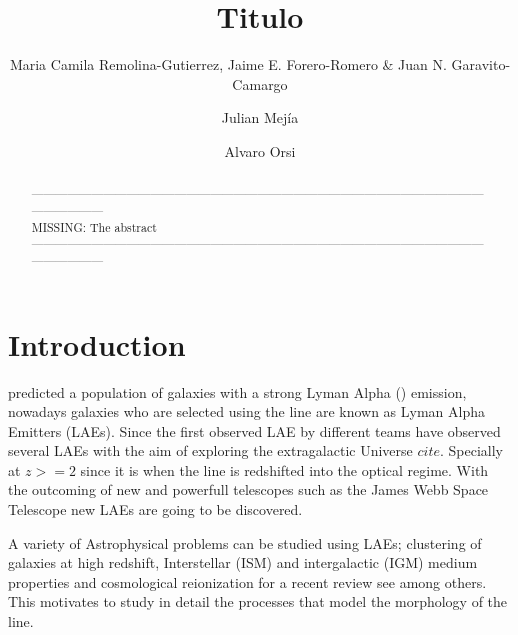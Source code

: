 \documentclass{latex/emulateapj}
\begin{document}
\title{Titulo}


\author{Maria Camila Remolina-Gutierrez, Jaime E. Forero-Romero \&
  Juan N. Garavito-Camargo} 
\author{Julian Mej\'ia}
\author{Alvaro Orsi}


\begin{abstract}
\noindent ------------------------------------------------------------------------------------------------------------------------------------\\
MISSING: The abstract\\
------------------------------------------------------------------------------------------------------------------------------------\\
\end{abstract}

\section{Introduction}
\label{sec:intro}

\cite{PartridgePeebles} predicted a population of galaxies with a strong 
Lyman Alpha (\lya) emission,  nowadays galaxies who are selected using the \lya 
line are known as Lyman Alpha Emitters (LAEs). Since the first 
observed LAE by \cite{DjorgovskiThompson} different teams have 
observed several LAEs \cite{Kulas12, Yamada2012,
  Chonis2013,Finkelstein2013,Ostlin14} with the aim of   exploring the
extragalactic Universe $cite{}$.  Specially at $z>=2$ since it is when
the  line is redshifted into the optical regime. With the outcoming of
new and powerfull telescopes such as the James Webb Space Telescope
new LAEs are going to be discovered. 
  
A variety of Astrophysical problems can be studied using LAEs;
clustering \citep{Behrens13} of galaxies at high redshift,
Interstellar (ISM) and intergalactic (IGM) medium  properties
\citep{DijkstraKramer} and cosmological reionization for a recent
review see \cite{review}  among others. This motivates to study in
detail the processes that model the morphology of the \lya line. 
\end{document}
